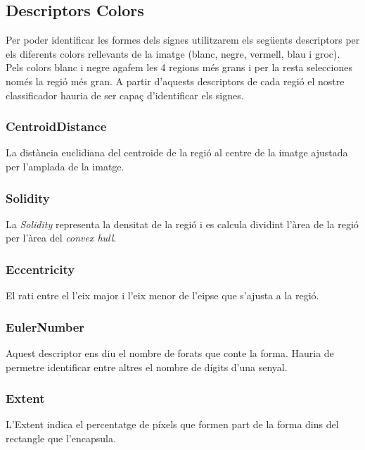 \subsection{Descriptors Colors}%
\label{sub:desc_col}

Per poder identificar les formes dels signes utilitzarem els següents descriptors per els diferents
colors rellevants de la imatge (blanc, negre, vermell, blau i groc). Pels colors blanc i
negre agafem les 4 regions més grans i per la resta selecciones només la regió més 
gran. A partir d'aquests descriptors
de cada regió el nostre classificador hauria de ser capaç d'identificar els signes.

\subsubsection{CentroidDistance}

La distància euclidiana del centroide de la regió al centre de la imatge ajustada
per l'amplada de la imatge.

\subsubsection{Solidity}

La \emph{Solidity} representa la densitat de la regió i es calcula dividint l'àrea
de la regió per l'àrea del \emph{convex hull}.

\subsubsection{Eccentricity}

El rati entre el l'eix major i l'eix menor de l'e\lgem ipse que s'ajusta a la regió.

\subsubsection{EulerNumber}

Aquest descriptor ens diu el nombre de forats que conte la forma. Hauria de permetre identificar entre
altres el nombre de dígits d'una senyal.

\subsubsection{Extent}

L'Extent indica el percentatge de píxels que formen part de la forma dins del rectangle que l'encapsula.

